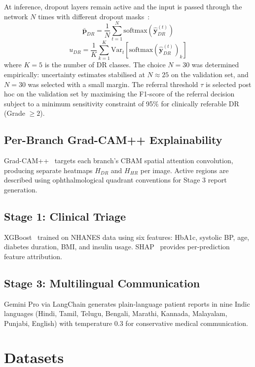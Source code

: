 \documentclass[conference]{IEEEtran}
\begin{document}
At inference, dropout layers remain active and the input is passed through the network $N$ times with different dropout masks~\cite{gal2016}:
\begin{equation}
\bar{\mathbf{p}}_{DR} = \frac{1}{N}\sum_{t=1}^{N}\text{softmax}(\hat{\mathbf{y}}_{DR}^{(t)})
\end{equation}
\begin{equation}
u_{DR} = \frac{1}{K}\sum_{k=1}^{K}\text{Var}_t[\text{softmax}(\hat{\mathbf{y}}_{DR}^{(t)})_k]
\end{equation}
where $K{=}5$ is the number of DR classes. The choice $N{=}30$ was determined empirically: uncertainty estimates stabilised at $N{\approx}25$ on the validation set, and $N{=}30$ was selected with a small margin. The referral threshold $\tau$ is selected post hoc on the validation set by maximising the F1-score of the referral decision subject to a minimum sensitivity constraint of 95\% for clinically referable DR (Grade $\geq 2$).

\subsection{Per-Branch Grad-CAM++ Explainability}

Grad-CAM++~\cite{chattopadhyay2018} targets each branch's CBAM spatial attention convolution, producing separate heatmaps $H_{DR}$ and $H_{HR}$ per image. Active regions are described using ophthalmological quadrant conventions for Stage 3 report generation.

\subsection{Stage 1: Clinical Triage}

XGBoost~\cite{chen2016} trained on NHANES data using six features: HbA1c, systolic BP, age, diabetes duration, BMI, and insulin usage. SHAP~\cite{lundberg2017} provides per-prediction feature attribution.

\subsection{Stage 3: Multilingual Communication}

Gemini Pro via LangChain generates plain-language patient reports in nine Indic languages (Hindi, Tamil, Telugu, Bengali, Marathi, Kannada, Malayalam, Punjabi, English) with temperature 0.3 for conservative medical communication.

\section{Datasets}
\end{document}
